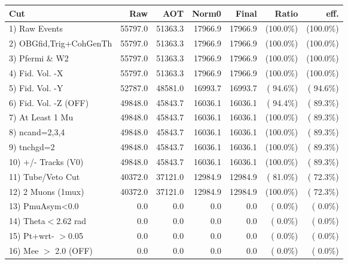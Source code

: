  \begin{table}[h!]\centering
 \begin{tabular}{||l||r|r|r|r|r|r||}
 \hline
 \hline
 Cut & Raw & AOT & Norm0 & Final & Ratio & eff.       \\
 \hline
  1) Raw Events           &      55797.0 &      51363.3 &      17966.9 &      17966.9 & (100.0\%) & (100.0\%) \\
  2) OBGfid,Trig+CohGenTh &      55797.0 &      51363.3 &      17966.9 &      17966.9 & (100.0\%) & (100.0\%) \\
  3) Pfermi \& W2         &      55797.0 &      51363.3 &      17966.9 &      17966.9 & (100.0\%) & (100.0\%) \\
  4) Fid. Vol. -X         &      55797.0 &      51363.3 &      17966.9 &      17966.9 & (100.0\%) & (100.0\%) \\
  5) Fid. Vol. -Y         &      52787.0 &      48581.0 &      16993.7 &      16993.7 & ( 94.6\%) & ( 94.6\%) \\
  6) Fid. Vol. -Z (OFF)   &      49848.0 &      45843.7 &      16036.1 &      16036.1 & ( 94.4\%) & ( 89.3\%) \\
  7) At Least 1 Mu        &      49848.0 &      45843.7 &      16036.1 &      16036.1 & (100.0\%) & ( 89.3\%) \\
  8) ncand=2,3,4          &      49848.0 &      45843.7 &      16036.1 &      16036.1 & (100.0\%) & ( 89.3\%) \\
  9) tnchgd=2             &      49848.0 &      45843.7 &      16036.1 &      16036.1 & (100.0\%) & ( 89.3\%) \\
 10) +/- Tracks (V0)      &      49848.0 &      45843.7 &      16036.1 &      16036.1 & (100.0\%) & ( 89.3\%) \\
 11) Tube/Veto Cut        &      40372.0 &      37121.0 &      12984.9 &      12984.9 & ( 81.0\%) & ( 72.3\%) \\
 12) 2 Muons (1mux)       &      40372.0 &      37121.0 &      12984.9 &      12984.9 & (100.0\%) & ( 72.3\%) \\
 13) PmuAsym<0.0          &          0.0 &          0.0 &          0.0 &          0.0 & (  0.0\%) & (  0.0\%) \\
 14) Theta$<$2.62 rad     &          0.0 &          0.0 &          0.0 &          0.0 & (  0.0\%) & (  0.0\%) \\
 15) Pt+wrt- $>$0.05      &          0.0 &          0.0 &          0.0 &          0.0 & (  0.0\%) & (  0.0\%) \\
 16) Mee $>$ 2.0  (OFF)   &          0.0 &          0.0 &          0.0 &          0.0 & (  0.0\%) & (  0.0\%) \\

\end{tabular}
\end{table}
